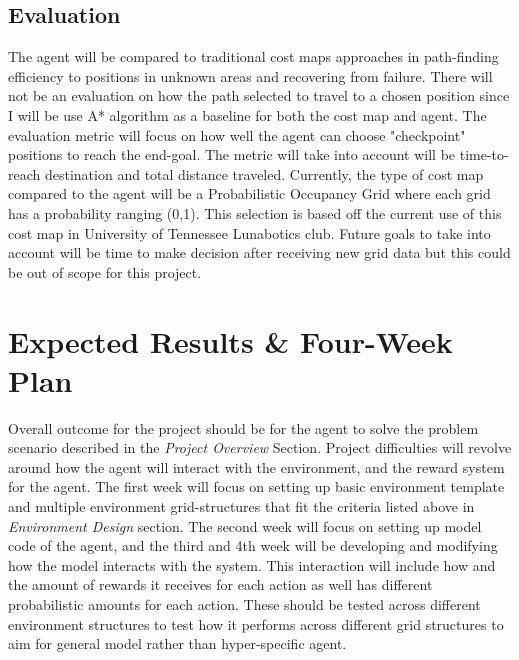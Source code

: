 \documentclass[12pt]{article}
\begin{document}
\subsection*{Evaluation}
\noindent The agent will be compared to traditional cost maps approaches in path-finding efficiency to positions in unknown areas and recovering from failure.
There will not be an evaluation on how the path selected to travel to a chosen position since I will be use A* algorithm as a baseline for both the cost map and agent.
The evaluation metric will focus on how well the agent can choose "checkpoint" positions to reach the end-goal.
The metric will take into account will be time-to-reach destination and total distance traveled.
Currently, the type of cost map compared to the agent will be a Probabilistic Occupancy Grid where each grid has a probability ranging (0,1).
This selection is based off the current use of this cost map in University of Tennessee Lunabotics club. 
Future goals to take into account will be time to make decision after receiving new grid data but this could be out of scope for this project. 

\section*{Expected Results \& Four-Week Plan}
Overall outcome for the project should be for the agent to solve the problem scenario described in the \textit{Project Overview} Section.
Project difficulties will revolve around how the agent will interact with the environment, and the reward system for the agent.
The first week will focus on setting up basic environment template and multiple environment grid-structures that fit the criteria listed above in \textit{Environment Design} section.
The second week will focus on setting up model code of the agent, and the third and 4th week will be developing and modifying how the model interacts with the system.
This interaction will include how and the amount of rewards it receives for each action as well has different probabilistic amounts for each action.
These should be tested across different environment structures to test how it performs across different grid structures to aim for general model rather than hyper-specific agent.
\end{document}
